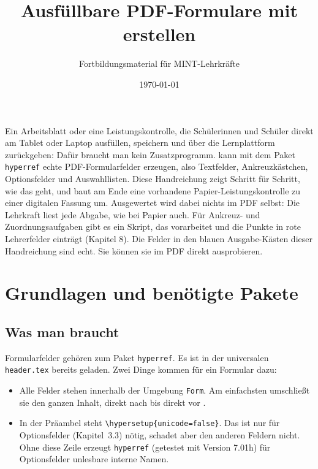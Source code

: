 



\title{Ausfüllbare PDF-Formulare mit  erstellen}
\author{Fortbildungsmaterial für MINT-Lehrkräfte}
\date{\today}
\pagestyle{plain}
\setlength{\parskip}{1.5em}


\begin{Form}

\maketitle

Ein Arbeitsblatt oder eine Leistungskontrolle, die Schülerinnen und Schüler
direkt am Tablet oder Laptop ausfüllen, speichern und über die Lernplattform
zurückgeben: Dafür braucht man kein Zusatzprogramm.  kann mit dem
Paket \texttt{hyperref} echte PDF-Formularfelder erzeugen, also Textfelder,
Ankreuzkästchen, Optionsfelder und Auswahllisten. Diese Handreichung zeigt
Schritt für Schritt, wie das geht, und baut am Ende eine vorhandene
Papier-Leistungskontrolle zu einer digitalen Fassung um. Ausgewertet wird
dabei nichts im PDF selbst: Die Lehrkraft liest jede Abgabe, wie bei
Papier auch. Für Ankreuz- und Zuordnungsaufgaben gibt es ein Skript, das
vorarbeitet und die Punkte in rote Lehrerfelder einträgt (Kapitel 8). Die Felder in den blauen Ausgabe-Kästen dieser Handreichung sind
echt. Sie können sie im PDF direkt ausprobieren.



\section{Grundlagen und benötigte Pakete}

\subsection{Was man braucht}

Formularfelder gehören zum Paket \texttt{hyperref}. Es ist in der universalen
\texttt{header.tex} bereits geladen. Zwei Dinge kommen für ein Formular dazu:

\begin{itemize}
	\item Alle Felder stehen innerhalb der Umgebung \texttt{Form}. Am
	einfachsten umschließt sie den ganzen Inhalt, direkt nach
	\verb|| bis direkt vor \verb||.
	\item In der Präambel steht \verb|\hypersetup{unicode=false}|. Das ist nur
	für Optionsfelder (Kapitel~3.3) nötig, schadet aber den anderen Feldern
	nicht. Ohne diese Zeile erzeugt \texttt{hyperref} (getestet mit Version
	7.01h) für Optionsfelder unlesbare interne Namen.
\end{itemize}


\end{Form}
